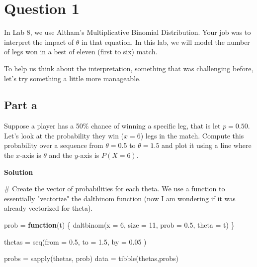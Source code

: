\documentclass[
]{article}
\newenvironment{Shaded}{\begin{snugshade}}{\end{snugshade}}
\newcommand{\AttributeTok}[1]{\textcolor[rgb]{0.40,0.45,0.13}{#1}}
\newcommand{\CommentTok}[1]{\textcolor[rgb]{0.37,0.37,0.37}{#1}}
\newcommand{\ControlFlowTok}[1]{\textcolor[rgb]{0.00,0.23,0.31}{\textbf{#1}}}
\newcommand{\DecValTok}[1]{\textcolor[rgb]{0.68,0.00,0.00}{#1}}
\newcommand{\FloatTok}[1]{\textcolor[rgb]{0.68,0.00,0.00}{#1}}
\newcommand{\FunctionTok}[1]{\textcolor[rgb]{0.28,0.35,0.67}{#1}}
\newcommand{\NormalTok}[1]{\textcolor[rgb]{0.00,0.23,0.31}{#1}}
\newcommand{\OtherTok}[1]{\textcolor[rgb]{0.00,0.23,0.31}{#1}}
\begin{document}
\normalsize

\section{Question 1}\label{question-1}

In Lab 8, we use Altham's Multiplicative Binomial Distribution. Your job
was to interpret the impact of \(\theta\) in that equation. In this lab,
we will model the number of legs won in a best of eleven (first to six)
match.

To help us think about the interpretation, something that was
challenging before, let's try something a little more manageable.

\subsection{Part a}\label{part-a}

Suppose a player has a 50\% chance of winning a specific leg, that is
let \(p=0.50\). Let's look at the probability they win (\(x=6\)) legs in
the match. Compute this probability over a sequence from \(\theta=0.5\)
to \(\theta=1.5\) and plot it using a line where the \(x\)-axis is
\(\theta\) and the \(y\)-axis is \(P(X=6)\).

\textbf{Solution}

\normalsize

\begin{Shaded}
\begin{Highlighting}[numbers=left,,]
\CommentTok{\# Create the vector of probabilities for each theta. We use a function to essentially "vectorize" the daltbinom function (now I am wondering if it was already vectorized for theta).}

\NormalTok{prob }\OtherTok{=} \ControlFlowTok{function}\NormalTok{(t) \{}
  \FunctionTok{daltbinom}\NormalTok{(}\AttributeTok{x =} \DecValTok{6}\NormalTok{, }\AttributeTok{size =} \DecValTok{11}\NormalTok{, }\AttributeTok{prob =} \FloatTok{0.5}\NormalTok{, }\AttributeTok{theta =}\NormalTok{ t)}
\NormalTok{\}}


\NormalTok{thetas }\OtherTok{=} \FunctionTok{seq}\NormalTok{(}\AttributeTok{from =} \FloatTok{0.5}\NormalTok{, }\AttributeTok{to =} \FloatTok{1.5}\NormalTok{, }\AttributeTok{by =} \FloatTok{0.05}\NormalTok{ )}

\NormalTok{probs }\OtherTok{=} \FunctionTok{sapply}\NormalTok{(thetas, prob)}
\NormalTok{data }\OtherTok{=} \FunctionTok{tibble}\NormalTok{(thetas,probs)}
\end{Highlighting}
\end{Shaded}
\end{document}
